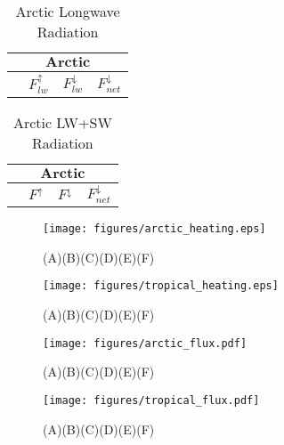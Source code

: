 \documentclass[10pt,twocolumn]{article}
\begin{document}
\begin{table}[h]
	\centering
	\caption{Arctic Longwave Radiation}
	\label{tab:alr}
	\begin{tabular}{lccc}
		\toprule
		\multicolumn{4}{c}{$\textbf{Arctic}$}\\
		\midrule
		& $F^\uparrow_{lw}$ & $F^\downarrow_{lw}$ & $F^\downarrow_{net}$\\
		\midrule
		
		\bottomrule
	\end{tabular}
	
\end{table}

\begin{table}[h]
	\centering
	\caption{Arctic LW+SW Radiation}
	\label{tab:acr}
	\begin{tabular}{lccc}
		\toprule
		\multicolumn{4}{c}{$\textbf{Arctic}$}\\
		\midrule
		& $F^\uparrow$ & $F^\downarrow$ & $F^\downarrow_{net}$\\
		\midrule
		
		\bottomrule
	\end{tabular}
	
\end{table}


\begin{figure*}[p]
	\centering
	\texttt{[image: figures/arctic\_heating.eps]}
	\caption{(A)(B)(C)(D)(E)(F)}
\end{figure*}

\begin{figure*}[p]
	\centering
	\texttt{[image: figures/tropical\_heating.eps]}
	\caption{(A)(B)(C)(D)(E)(F)}
\end{figure*}

\begin{figure*}[p]
	\centering
	\texttt{[image: figures/arctic\_flux.pdf]}
	\caption{(A)(B)(C)(D)(E)(F)}
\end{figure*}

\begin{figure*}[p]
	\centering
	\texttt{[image: figures/tropical\_flux.pdf]}
	\caption{(A)(B)(C)(D)(E)(F)}
\end{figure*}
\end{document}
